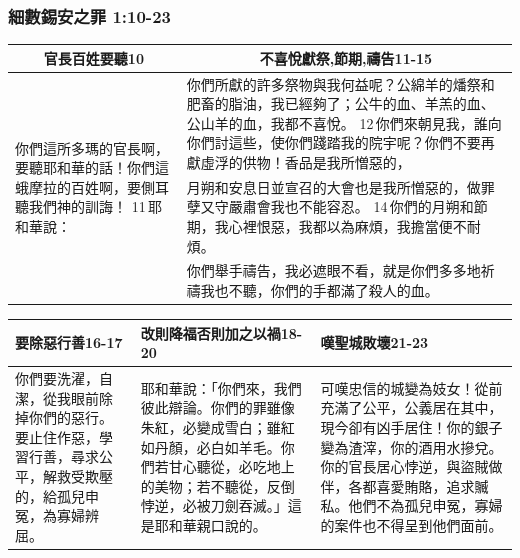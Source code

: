 \subsubsection{細數錫安之罪 1:10-23}
\begin{table}[H]
\centering 
\begin{tabular}{p{2.75cm}|p{}}\hline\hline
\multicolumn{1}{c}{官長百姓要聽10}&\multicolumn{1}{c}{不喜悅獻祭,節期,禱告11-15}\\\hline
\multirow{3}{2.9cm}{你們這所多瑪的官長啊，要聽耶和華的話！你們這蛾摩拉的百姓啊，要側耳聽我們神的訓誨！ 11 耶和華說：}
&你們所獻的許多祭物與我何益呢？公綿羊的燔祭和肥畜的脂油，我已經夠了；公牛的血、羊羔的血、公山羊的血，我都不喜悅。 12 你們來朝見我，誰向你們討這些，使你們踐踏我的院宇呢？你們不要再獻虛浮的供物！香品是我所憎惡的，\\\cline{2-2}
&月朔和安息日並宣召的大會也是我所憎惡的，做罪孽又守嚴肅會我也不能容忍。 14 你們的月朔和節期，我心裡恨惡，我都以為麻煩，我擔當便不耐煩。\\\cline{2-2}
&你們舉手禱告，我必遮眼不看，就是你們多多地祈禱我也不聽，你們的手都滿了殺人的血。\\\hline
\end{tabular}
\end{table}

\begin{table}[H]
\centering 
\begin{tabular}{p{3.85cm}|p{6.25cm}|p{7.25cm}}\hline\hline
要除惡行善16-17&改則降福否則加之以禍18-20&嘆聖城敗壞21-23\\\hline
你們要洗濯，自潔，從我眼前除掉你們的惡行。要止住作惡，學習行善，尋求公平，解救受欺壓的，給孤兒申冤，為寡婦辨屈。
&耶和華說：「你們來，我們彼此辯論。你們的罪雖像朱紅，必變成雪白；雖紅如丹顏，必白如羊毛。你們若甘心聽從，必吃地上的美物；若不聽從，反倒悖逆，必被刀劍吞滅。」這是耶和華親口說的。
&可嘆忠信的城變為妓女！從前充滿了公平，公義居在其中，現今卻有凶手居住！你的銀子變為渣滓，你的酒用水摻兌。你的官長居心悖逆，與盜賊做伴，各都喜愛賄賂，追求贓私。他們不為孤兒申冤，寡婦的案件也不得呈到他們面前。\\\hline
\end{tabular}
\end{table}

